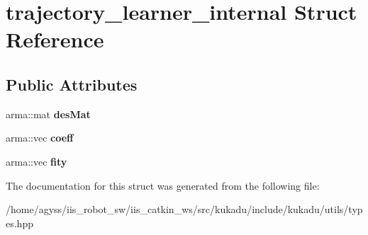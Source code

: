 \hypertarget{structtrajectory__learner__internal}{}\section{trajectory\+\_\+learner\+\_\+internal Struct Reference}
\label{structtrajectory__learner__internal}
\subsection*{Public Attributes}
\begin{DoxyCompactItemize}
\item 
arma\+::mat {\bfseries des\+Mat}\hypertarget{structtrajectory__learner__internal_acfb301377b9742e3683d20b485668018}{}\label{structtrajectory__learner__internal_acfb301377b9742e3683d20b485668018}

\item 
arma\+::vec {\bfseries coeff}\hypertarget{structtrajectory__learner__internal_acaadde0fada7f99179f74597342c1490}{}\label{structtrajectory__learner__internal_acaadde0fada7f99179f74597342c1490}

\item 
arma\+::vec {\bfseries fity}\hypertarget{structtrajectory__learner__internal_a05839c6bdb48c5f3cce87225f79197c9}{}\label{structtrajectory__learner__internal_a05839c6bdb48c5f3cce87225f79197c9}

\end{DoxyCompactItemize}


The documentation for this struct was generated from the following file\+:\begin{DoxyCompactItemize}
\item 
/home/agyss/iis\+\_\+robot\+\_\+sw/iis\+\_\+catkin\+\_\+ws/src/kukadu/include/kukadu/utils/types.\+hpp\end{DoxyCompactItemize}
